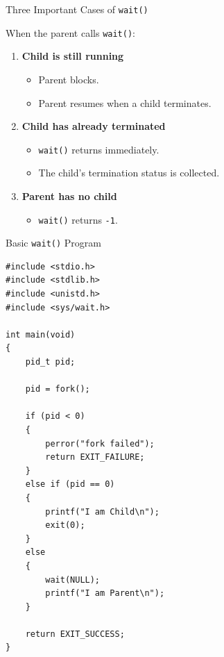 \documentclass[aspectratio=169]{beamer}
\begin{document}
\begin{frame}{Three Important Cases of \texttt{wait()}}

When the parent calls \texttt{wait()}:

\begin{enumerate}

    \item \textbf{Child is still running}

    \begin{itemize}
        \item Parent blocks.
        \item Parent resumes when a child terminates.
    \end{itemize}

    \item \textbf{Child has already terminated}

    \begin{itemize}
        \item \texttt{wait()} returns immediately.
        \item The child's termination status is collected.
    \end{itemize}

    \item \textbf{Parent has no child}

    \begin{itemize}
        \item \texttt{wait()} returns \texttt{-1}.
    \end{itemize}

\end{enumerate}

\end{frame}

\begin{frame}[fragile]{Basic \texttt{wait()} Program}

\begin{lstlisting}[style=cstyle]
#include <stdio.h>
#include <stdlib.h>
#include <unistd.h>
#include <sys/wait.h>

int main(void)
{
    pid_t pid;

    pid = fork();

    if (pid < 0)
    {
        perror("fork failed");
        return EXIT_FAILURE;
    }
    else if (pid == 0)
    {
        printf("I am Child\n");
        exit(0);
    }
    else
    {
        wait(NULL);
        printf("I am Parent\n");
    }

    return EXIT_SUCCESS;
}
\end{lstlisting}

\end{frame}
\end{document}
